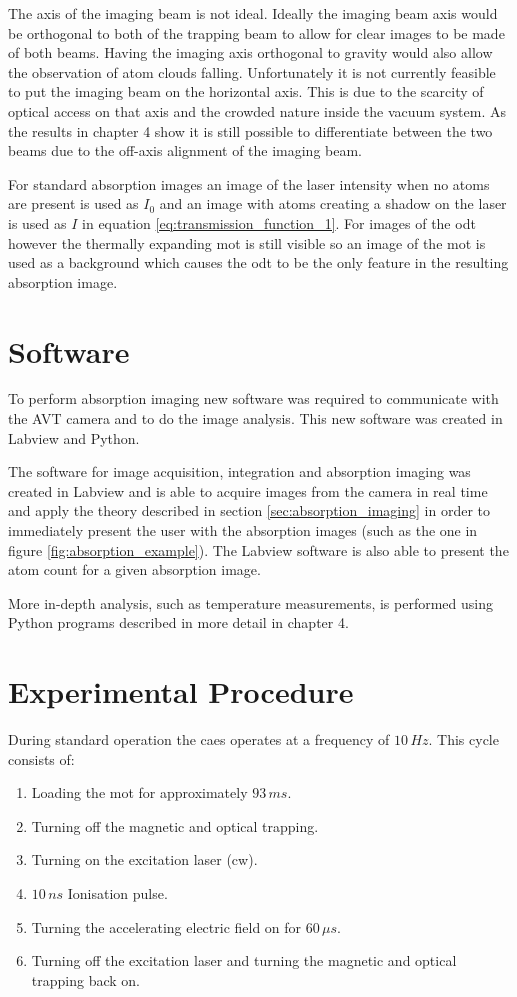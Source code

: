 The axis of the imaging beam is not ideal. Ideally the imaging beam axis would be orthogonal to both of the trapping beam to allow for clear images to be made of both beams. Having the imaging axis orthogonal to gravity would also allow the observation of atom clouds falling. Unfortunately it is not currently feasible to put the imaging beam on the horizontal axis. This is due to the scarcity of optical access on that axis and the crowded nature inside the vacuum system. As the results in chapter 4 show it is still possible to differentiate between the two beams due to the off-axis alignment of the imaging beam.

For standard absorption images an image of the laser intensity when no atoms are present is used as $I_0$ and an image with atoms creating a shadow on the laser is used as $I$ in equation \ref{eq:transmission_function_1}. For images of the \gls{odt} however the thermally expanding \gls{mot} is still visible so an image of the \gls{mot} is used as a background which causes the \gls{odt} to be the only feature in the resulting absorption image.

\section{Software}

To perform absorption imaging new software was required to communicate with the AVT camera and to do the image analysis. This new software was created in Labview and Python.

The software for image acquisition, integration and absorption imaging was created in Labview and is able to acquire images from the camera in real time and apply the theory described in section \ref{sec:absorption_imaging} in order to immediately present the user with the absorption images (such as the one in figure \ref{fig:absorption_example}). The Labview software is also able to present the atom count for a given absorption image.

More in-depth analysis, such as temperature measurements, is performed using Python programs described in more detail in chapter 4.

\section{Experimental Procedure}

During standard operation the \gls{caes} operates at a frequency of $10\,\unit{Hz}$. This cycle consists of:
\begin{enumerate}
\item Loading  the \gls{mot} for approximately $93\,\unit{ms}$.
\item Turning off the magnetic and optical trapping.
\item Turning on the excitation laser (\gls{cw}).
\item $10\,\unit{ns}$ Ionisation pulse.
\item Turning the accelerating electric field on for $60\,\unit{\mu s}$.
\item Turning off the excitation laser and turning the magnetic and optical trapping back on.
\end{enumerate}

